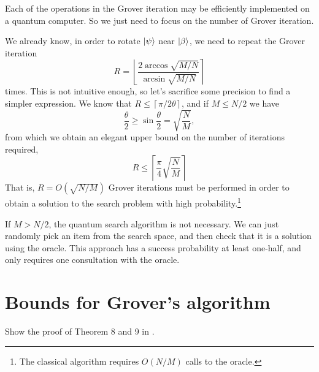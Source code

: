 \documentclass[a4paper,10pt]{article}
\numberwithin{equation}{subsection}
\begin{document}
Each of the operations in the Grover iteration may be efficiently implemented on a quantum computer. So we just need to focus on the number of Grover iteration.

We already know, in order to rotate $\ket{\psi}$ near $\ket{\beta}$, we need to repeat the Grover iteration
\begin{equation}
    R=\left\lfloor\frac{2\arccos\sqrt{M/N}}{\arcsin\sqrt{M/N}}\right\rceil
\end{equation}
times. This is not intuitive enough, so let's sacrifice some precision to find a simpler expression. We know that $R\leq\left\lceil\pi/2\theta\right\rceil$, and if $M\leq N/2$ we have
\begin{equation}
    \frac{\theta}{2}\geq\sin\frac{\theta}{2}=\sqrt{\frac{N}{M}},
\end{equation}
from which we obtain an elegant upper bound on the number of iterations required,
\begin{equation}
    R\leq\left\lceil\frac{\pi}{4}\sqrt{\frac{N}{M}}\right\rceil
\end{equation}
That is, $R=O(\sqrt{N/M})$ Grover iterations must be performed in order to obtain a solution to the search problem with high probability.\footnote{The classical algorithm requires $O(N/M)$ calls to the oracle.}

If $M>N/2$, the quantum search algorithm is not necessary. We can just randomly pick an item from the search space, and then check that it is a solution using the oracle. This approach has a success probability at least one-half, and only requires one consultation with the oracle.



\section{Bounds for Grover's algorithm}

Show the proof of Theorem 8 and 9 in \cite{2009Exact}.





\end{document}
